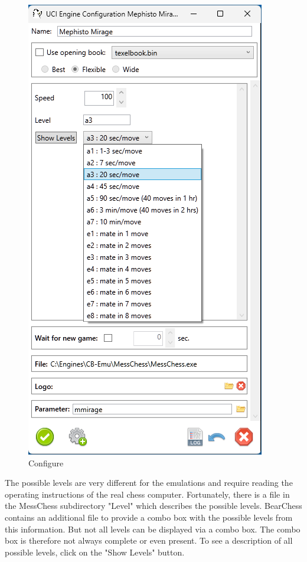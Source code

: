 \documentclass[11pt,a4paper]{article}
\begin{document}
	\begin{figure}[H]
		\centering
		\includegraphics[scale=0.8]{MessChess3.png}
		\caption{Configure}
		\label{fig:MessChess3}
	\end{figure}
	The possible levels are very different for the emulations and require reading the operating instructions of the real chess computer. 
	Fortunately, there is a file in the MessChess subdirectory "Level" which describes the possible levels. 
	BearChess contains an additional file to provide a combo box with the possible levels from this information.
	But not all levels can be displayed via a combo box. The combo box is therefore not always complete or even present. To see a description of all possible levels, click on the "Show Levels" button.\\
	
\end{document}
